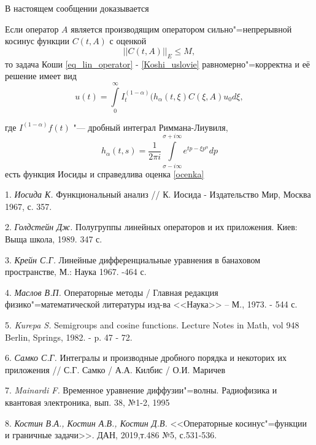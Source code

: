 В настоящем сообщении доказывается
	\begin{theorem}
		Если оператор $A$ является производящим оператором сильно"=непрерывной косинус функции $C(t,A)$ с оценкой
		\begin{equation}
			||C(t,A)||_E \leq M,
		\end{equation}
		то задача Коши \ref{eq_lin_operator} - \ref{Koshi_uslovie} равномерно"=корректна и её решение имеет вид
		\begin{equation}
			u(t) = \int\limits^{\infty}_0 I^{(1-\alpha)}_t (h_{\alpha}(t, \xi) C(\xi, A)u_0 d\xi,
		\end{equation}
	\end{theorem}
	где $I^{(1-\alpha)}f(t)$ "--- дробный интеграл Риммана-Лиувиля,
	$$
		h_\alpha(t,s) = \frac{1}{2\pi i} \int\limits^{\sigma + i\infty}_{\sigma - i \infty} e^{tp-\xi p^{\alpha}} dp
	$$ есть функция Иосиды
	и справедлива оценка \ref{ocenka}

\litlist

1. {\it Иосида К.} Функциональный анализ // К. Иосида - Издательство Мир, Москва 1967, с. 357.

2. {\it Голдстейн Дж.} Полугруппы линейных операторов и их приложения. Киев: Выща школа, 1989. 347 с.

3. {\it Крейн С.Г.} Линейные дифференциальные уравнения в банаховом пространстве, М.: Наука 1967. -464 с.

4. {\it Маслов В.П.} Операторные методы / Главная редакция физико"=математической литературы изд-ва <<Наука>> -- М., 1973. - 544 с.

5. {\it Kurepa S.} Semigroups and cosine functions. Lecture Notes in Math, vol 948 Berlin, Springs, 1982. - p. 47 - 72.

6. {\it Самко С.Г.} Интегралы и производные дробного порядка и некоторих их приложения // С.Г. Самко / А.А. Килбис / О.И. Маричев

7. {\it Mainardi F.} Временное уравнение диффузии"=волны. Радиофизика и квантовая электроника, вып. 38, №1-2, 1995

8. {\it Костин В.А., Костин А.В., Костин Д.В.} <<Операторные косинус"=функции и граничные задачи>>. ДАН, 2019,т.486 №5, с.531-536.
